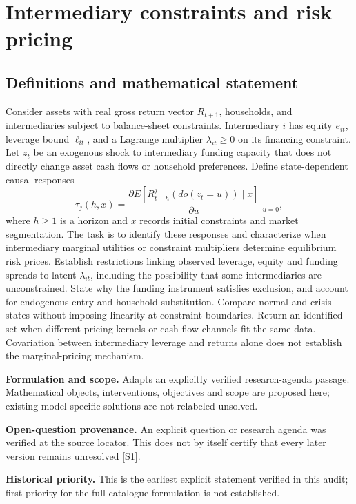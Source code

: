 \documentclass[11pt]{article}
\newcommand{\sref}[2]{\hyperlink{source:#1:#2}{[S#2]}}
\begin{document}
\section*{Intermediary constraints and risk pricing}\label{30007598}
\subsection{Definitions and mathematical statement}
Consider assets with real gross return vector \(R_{t+1}\), households, and intermediaries subject to balance-sheet constraints. Intermediary \(i\) has equity \(e_{it}\), leverage bound \(\ell_{it}\), and a Lagrange multiplier \(\lambda_{it}\geq0\) on its financing constraint. Let \(z_t\) be an exogenous shock to intermediary funding capacity that does not directly change asset cash flows or household preferences. Define state-dependent causal responses
\[\tau_j(h,x)=\frac{\partial E[R^j_{t+h}(do(z_t=u))\mid x]}{\partial u}\Big|_{u=0},\]
where \(h\geq1\) is a horizon and \(x\) records initial constraints and market segmentation. The task is to identify these responses and characterize when intermediary marginal utilities or constraint multipliers determine equilibrium risk prices. Establish restrictions linking observed leverage, equity and funding spreads to latent \(\lambda_{it}\), including the possibility that some intermediaries are unconstrained. State why the funding instrument satisfies exclusion, and account for endogenous entry and household substitution. Compare normal and crisis states without imposing linearity at constraint boundaries. Return an identified set when different pricing kernels or cash-flow channels fit the same data. Covariation between intermediary leverage and returns alone does not establish the marginal-pricing mechanism.

\par\textbf{Formulation and scope.} Adapts an explicitly verified research-agenda passage. Mathematical objects, interventions, objectives and scope are proposed here; existing model-specific solutions are not relabeled unsolved.

\par\textbf{Open-question provenance.} An explicit question or research agenda was verified at the source locator. This does not by itself certify that every later version remains unresolved \sref{30007598}{1}.

\par\textbf{Historical priority.} This is the earliest explicit statement verified in this audit; first priority for the full catalogue formulation is not established.
\end{document}
